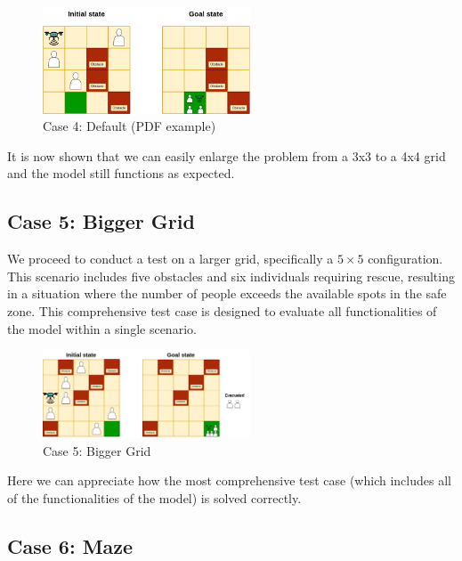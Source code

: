 \documentclass{article}
\begin{document}
\begin{figure}[ht]
    \centering
    \includegraphics[width=0.55\textwidth]{assets/problem-4-pdf-example.drawio.png}
    \caption{Case 4: Default (PDF example)}
    \label{fig:initial-state-default}
\end{figure}
\FloatBarrier

It is now shown that we can easily enlarge the problem from a 3x3 to a 4x4 grid and the model still functions as expected.

\subsection{Case 5: Bigger Grid}

We proceed to conduct a test on a larger grid, specifically a \(5 \times 5\) configuration. This scenario includes five obstacles and six individuals requiring rescue, resulting in a situation where the number of people exceeds the available spots in the safe zone. This comprehensive test case is designed to evaluate all functionalities of the model within a single scenario.

\begin{figure}[ht]
    \centering
    \includegraphics[width=0.55\textwidth]{assets/problem-5-big.drawio.png}
    \caption{Case 5: Bigger Grid}
    \label{fig:initial-state-bigger-grid}
\end{figure}
\FloatBarrier

Here we can appreciate how the most comprehensive test case (which includes all of the functionalities of the model) is solved correctly.

\subsection{Case 6: Maze}
\end{document}
